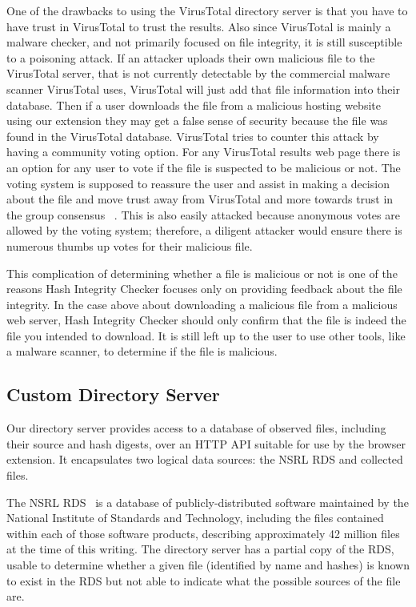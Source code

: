 \documentclass[letterpaper,twocolumn,10pt]{article}
\begin{document}
One of the drawbacks to using the VirusTotal directory server is that you have to have trust in VirusTotal to trust the results. Also since VirusTotal is mainly a malware checker, and not primarily focused on file integrity, it is still susceptible to a poisoning attack. If an attacker uploads their own malicious file to the VirusTotal server, that is not currently detectable by the commercial malware scanner VirusTotal uses, VirusTotal will just add that file information into their database. Then if a user downloads the file from a malicious hosting website using our extension they may get a false sense of security because the file was found in the VirusTotal database. VirusTotal tries to counter this attack by having a community voting option. For any VirusTotal results web page there is an option for any user to vote if the file is suspected to be malicious or not. The voting system is supposed to reassure the user and assist in making a decision about the file and move trust away from VirusTotal and more towards trust in the group consensus ~\cite{GroupPolarization}. This is also easily attacked because anonymous votes are allowed by the voting system; therefore, a diligent attacker would ensure there is numerous thumbs up votes for their malicious file.

This complication of determining whether a file is malicious or not is one of the reasons Hash Integrity Checker focuses only on providing feedback about the file integrity. In the case above about downloading a malicious file from a malicious web server, Hash Integrity Checker should only confirm that the file is indeed the file you intended to download. It is still left up to the user to use other tools, like a malware scanner, to determine if the file is malicious.

\subsection{Custom Directory Server}

Our directory server provides access to a database of observed files, including their
source and hash digests, over an HTTP API suitable for use by the browser extension.
It encapsulates two logical data sources: the NSRL RDS and collected files.

The NSRL RDS~\cite{nsrl-rds} is a database of publicly-distributed software maintained by the
National Institute of Standards and Technology, including the files contained within each
of those software products, describing approximately 42 million files at the time of this
writing. The directory server has a partial copy of the RDS, usable to determine
whether a given file (identified by name and hashes) is known to exist in the RDS
but not able to indicate what the possible sources of the file are.
\end{document}
